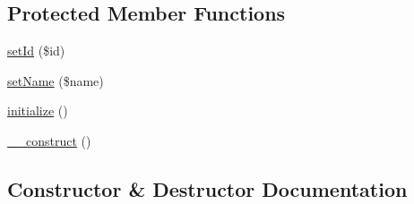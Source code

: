 \subsection*{Protected Member Functions}
\begin{DoxyCompactItemize}
\item 
\hyperlink{class_able_polecat___access_control___token_abstract_a87313ad678fb2a2a8efb435cf0bdb9a0}{set\+Id} (\$id)
\item 
\hyperlink{class_able_polecat___access_control___token_abstract_a2fe666694997d047711d7653eca2f132}{set\+Name} (\$name)
\item 
\hyperlink{class_able_polecat___access_control___token_abstract_a91098fa7d1917ce4833f284bbef12627}{initialize} ()
\item 
\hyperlink{class_able_polecat___access_control___token_abstract_a095c5d389db211932136b53f25f39685}{\+\_\+\+\_\+construct} ()
\end{DoxyCompactItemize}


\subsection{Constructor \& Destructor Documentation}
\hypertarget{class_able_polecat___access_control___token_abstract_a095c5d389db211932136b53f25f39685}{}
